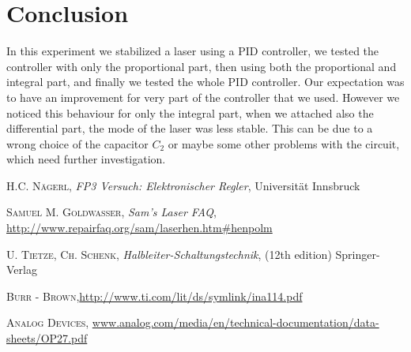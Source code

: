 \documentclass[a4paper,10pt]{article}
\begin{document}
\section{Conclusion}

In this experiment we stabilized a laser using a PID controller, we tested the controller with only the proportional part, then using both the proportional and integral part, and finally we tested the whole PID controller. Our expectation was to have an improvement for very part of the controller that we used. However we noticed this behaviour for only the integral part, when we attached also the differential part, the mode of the laser was less stable. This can be due to a wrong choice of the capacitor $C_2$ or maybe some other problems with the circuit, which need further investigation.


\begin{thebibliography}{99}
\textsc{H.C. Nägerl}, \textit{FP3 Versuch: Elektronischer Regler}, Universität Innsbruck

\textsc{Samuel M. Goldwasser}, \textit{Sam's Laser FAQ}, \url{http://www.repairfaq.org/sam/laserhen.htm#henpolm}

\textsc{U. Tietze, Ch. Schenk}, \textit{Halbleiter-Schaltungstechnik}, (12th edition) Springer-Verlag

\textsc{Burr - Brown},\url{http://www.ti.com/lit/ds/symlink/ina114.pdf}

\textsc{Analog Devices}, \url{www.analog.com/media/en/technical-documentation/data-sheets/OP27.pdf}
\end{thebibliography}
\end{document}
